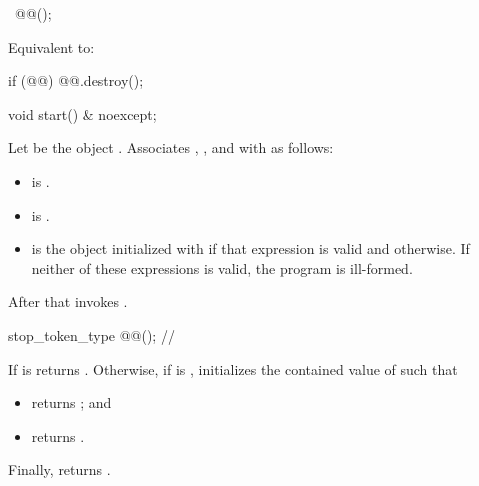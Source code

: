 %
\begin{itemdecl}
~@@();
\end{itemdecl}
\begin{itemdescr}
\pnum
\effects
Equivalent to:
\begin{codeblock}
if (@@)
  @@.destroy();
\end{codeblock}
\end{itemdescr}

%
\begin{itemdecl}
void start() & noexcept;
\end{itemdecl}
\begin{itemdescr}
\pnum
\effects
Let  be the object .
Associates , , and 
with  as follows:
\begin{itemize}
\item {} is .
\item {} is .
\item {} is the object initialized
with 
if that expression is valid and  otherwise.
If neither of these expressions is valid, the program is ill-formed.
\end{itemize}
After that invokes .
\end{itemdescr}

%
\begin{itemdecl}
stop_token_type @@();           // \expos
\end{itemdecl}
\begin{itemdescr}
\pnum
\effects
If
is 
returns .
Otherwise, if  is ,
initializes the contained value of  such that
\begin{itemize}
\item
{} returns
;\linebreak
and
\item
{} returns
.
\end{itemize}
Finally, returns .
\end{itemdescr}

